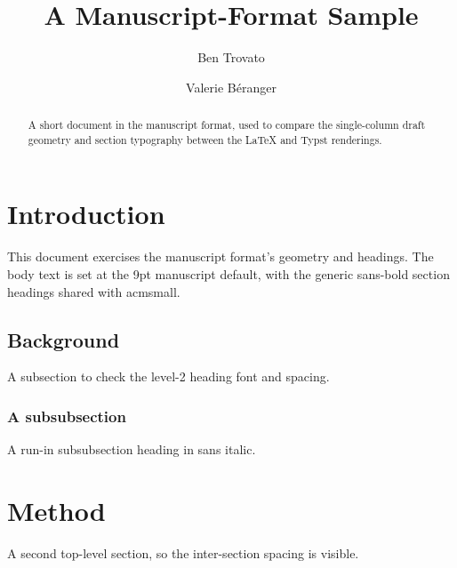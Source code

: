 \documentclass[manuscript]{acmart}
\begin{document}
\title{A Manuscript-Format Sample}

\author{Ben Trovato}

\author{Valerie B\'eranger}

\begin{abstract}
  A short document in the manuscript format, used to compare the single-column
  draft geometry and section typography between the LaTeX and Typst renderings.
\end{abstract}


\maketitle

\section{Introduction}
This document exercises the manuscript format's geometry and headings. The body
text is set at the 9pt manuscript default, with the generic sans-bold section
headings shared with acmsmall.

\subsection{Background}
A subsection to check the level-2 heading font and spacing.

\subsubsection{A subsubsection}
A run-in subsubsection heading in sans italic.

\section{Method}
A second top-level section, so the inter-section spacing is visible.
\end{document}
